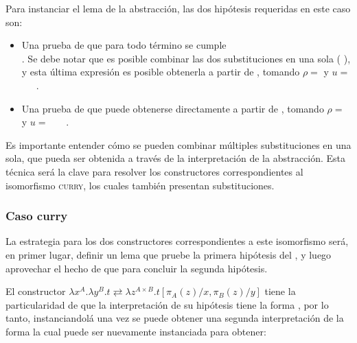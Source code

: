 
Para instanciar el lema de la abstracción, las dos hipótesis requeridas en este caso son:
\begin{itemize}
	\item Una prueba de que para todo término \snstar {} se cumple \\
	\snstar
	.
	Se debe notar que es posible combinar las dos substituciones en una sola
	\snstar (\subst
	{\cons
		{\const{[}  \const{]≡} }
		{\parens{\comp{\ids}{\bound{$\rho$}}}}}
	{}), y esta última expresión es posible obtenerla a partir de , tomando $\rho =$ \bound{$\rho$} y $u =$ \const{[}~~\const{]≡}~.
	
	\item Una prueba de
	\snstar
	\subst
	{\cons
		{\const{[}  \const{]≡} }
		{}}
	{} que puede obtenerse directamente a partir de , tomando $\rho =$  y $u =$ \const{[}~~\const{]≡}~.
\end{itemize}

Es importante entender cómo se pueden combinar múltiples substituciones en una sola, que pueda ser obtenida a través de la interpretación de la abstracción.
Esta técnica será la clave para resolver los constructores correspondientes al isomorfismo \textsc{curry}, los cuales también presentan substituciones.

\subsubsection{Caso curry}

La estrategia para los dos constructores correspondientes a este isomorfismo será, en primer lugar, definir un lema que pruebe la primera hipótesis del , y luego aprovechar el hecho de que
  
para concluir la segunda hipótesis.

El constructor  $\lambda x^A. \lambda y^B. t \rightleftarrows \lambda z^{A \times B}. t[\pi_A(z)/x, \pi_B(z)/y]$ tiene la particularidad de que la interpretación de su hipótesis tiene la forma 
, por lo tanto, instanciandolá una vez se puede obtener una segunda interpretación de la forma
la cual puede ser nuevamente instanciada para obtener:


